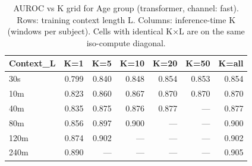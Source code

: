 \begin{table}[ht]
\centering
\caption{AUROC vs K grid for Age group (transformer, channel: fast). Rows: training context length L. Columns: inference-time K (windows per subject). Cells with identical K×L are on the same iso-compute diagonal.}
\label{tab:kgrid_age_class_transformer_fast}
\begin{tabular}{lrrrrrr}
\toprule
Context_L & K=1 & K=5 & K=10 & K=20 & K=50 & K=all \\
\midrule
30s & 0.799 & 0.840 & 0.848 & 0.854 & 0.853 & 0.854 \\
10m & 0.823 & 0.860 & 0.867 & 0.870 & 0.870 & 0.870 \\
40m & 0.835 & 0.875 & 0.876 & 0.877 & — & 0.877 \\
80m & 0.856 & 0.897 & 0.900 & — & — & 0.900 \\
120m & 0.874 & 0.902 & — & — & — & 0.902 \\
240m & 0.890 & — & — & — & — & 0.905 \\
\bottomrule
\end{tabular}
\end{table}